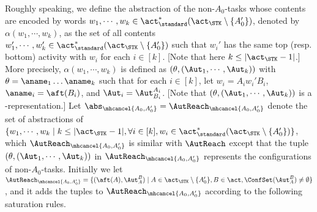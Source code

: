 Roughly speaking, we define the abstraction of the non-$A_0$-tasks whose contents are encoded by words $w_1,\cdots,w_k\in\act_{\standard}^*(\act_{\STK}\setminus\{A_0'\})$, denoted by $\alpha(w_1,\cdots,w_k)$, as the set of all contents $w_1',\cdots,w_k'\in\act_{\standard}^*(\act_{\STK}\setminus\{A_0'\})$ such that $w_i'$ has the same top (resp. bottom) activity with $w_i$ for each $i\in[k]$. [Note that here $k\le |\act_{\STK}-1|$.]
More precisely, $\alpha(w_1,\cdots,w_k)$ is defined as $(\theta,(\Aut_1,\cdots,\Aut_k))$ with $\theta = \aname_1\dots\aname_k$ such that for each $i\in[k]$, let $w_i = A_iw_i'B_i$, $\aname_i = \aft(B_i)$, and $\Aut_i = \Aut_{B_i}^{A_i}$. [Note that $(\theta,(\Aut_1,\cdots,\Aut_k))$ is a {\WOTrNFA}-representation.]
Let $\abs_{\mhcancel{A_0,A_0'}} = \AutReach_{\mhcancel{A_0,A_0'}}$ denote the set of abstractions of $\{w_1,\cdots,w_k\mid k\le|\act_{\STK}-1|,\forall i\in[k], w_i\in\act_{\standard}^*(\act_{\STK}\setminus\{A_0'\})\}$, which $\AutReach_{\mhcancel{A_0,A_0'}}$ is similar with $\AutReach$ except that the tuple $(\theta,(\Aut_1,\cdots,\Aut_k))$ in $\AutReach_{\mhcancel{A_0,A_0'}}$ represents the configurations of non-$A_0$-tasks.
Initially we let $\AutReach_{\mhcancel{A_0,A_0'}}=\{(\aft(A),\Aut_{A}^{B})\mid A\in\act_{\STK}\setminus\{A_0'\},B\in\act,\ConfSet(\Aut_{A}^B)\neq\emptyset\}$,
    and it adds the tuples to $\AutReach_{\mhcancel{A_0,A_0'}}$ according to the following saturation rules.

